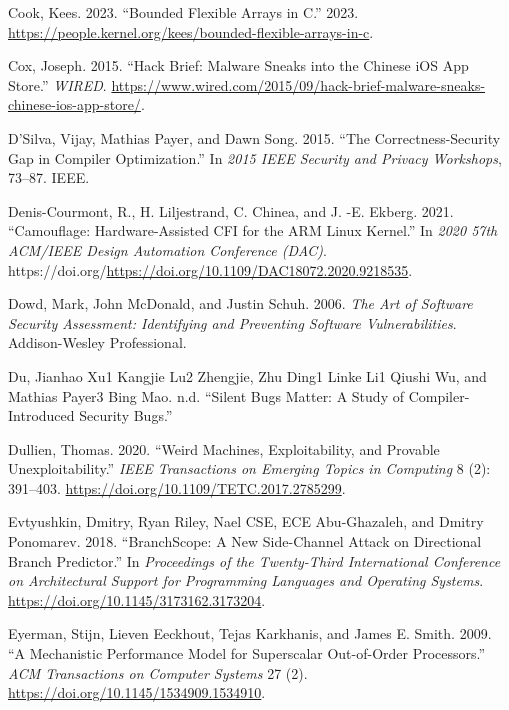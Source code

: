\documentclass[
  a4paper,
]{report}
\newlength{\cslhangindent}
\newenvironment{CSLReferences}[2] %
{\begin{list}{}{%
	\setlength{\itemindent}{0pt}
	\setlength{\leftmargin}{0pt}
	\setlength{\parsep}{0pt}
	\ifodd #1
	\setlength{\leftmargin}{\cslhangindent}
	\setlength{\itemindent}{-1\cslhangindent}
	\fi
	\setlength{\itemsep}{#2\baselineskip}}}
{\end{list}}
\begin{document}
\begin{CSLReferences}{1}{0}
Cook, Kees. 2023. {``Bounded Flexible Arrays in {C}.''} 2023.
\url{https://people.kernel.org/kees/bounded-flexible-arrays-in-c}.

Cox, Joseph. 2015. {``Hack Brief: Malware Sneaks into the Chinese iOS
App Store.''} \emph{WIRED}.
\url{https://www.wired.com/2015/09/hack-brief-malware-sneaks-chinese-ios-app-store/}.

D'Silva, Vijay, Mathias Payer, and Dawn Song. 2015. {``The
Correctness-Security Gap in Compiler Optimization.''} In \emph{2015 IEEE
Security and Privacy Workshops}, 73--87. IEEE.

Denis-Courmont, R., H. Liljestrand, C. Chinea, and J. -E. Ekberg. 2021.
{``Camouflage: Hardware-Assisted CFI for the ARM Linux Kernel.''} In
\emph{2020 57th ACM/IEEE Design Automation Conference (DAC)}.
https://doi.org/\url{https://doi.org/10.1109/DAC18072.2020.9218535}.

Dowd, Mark, John McDonald, and Justin Schuh. 2006. \emph{The Art of
Software Security Assessment: Identifying and Preventing Software
Vulnerabilities}. Addison-Wesley Professional.

Du, Jianhao Xu1 Kangjie Lu2 Zhengjie, Zhu Ding1 Linke Li1 Qiushi Wu, and
Mathias Payer3 Bing Mao. n.d. {``Silent Bugs Matter: A Study of
Compiler-Introduced Security Bugs.''}

Dullien, Thomas. 2020. {``Weird Machines, Exploitability, and Provable
Unexploitability.''} \emph{IEEE Transactions on Emerging Topics in
Computing} 8 (2): 391--403.
\url{https://doi.org/10.1109/TETC.2017.2785299}.

Evtyushkin, Dmitry, Ryan Riley, Nael CSE, ECE Abu-Ghazaleh, and Dmitry
Ponomarev. 2018. {``BranchScope: A New Side-Channel Attack on
Directional Branch Predictor.''} In \emph{Proceedings of the
Twenty-Third International Conference on Architectural Support for
Programming Languages and Operating Systems}.
\url{https://doi.org/10.1145/3173162.3173204}.

Eyerman, Stijn, Lieven Eeckhout, Tejas Karkhanis, and James E. Smith.
2009. {``A Mechanistic Performance Model for Superscalar Out-of-Order
Processors.''} \emph{{ACM} Transactions on Computer Systems} 27 (2).
\url{https://doi.org/10.1145/1534909.1534910}.


\end{CSLReferences}
\end{document}
